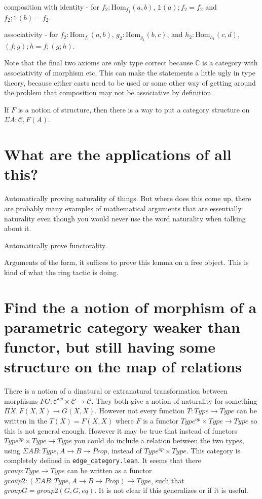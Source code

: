 \documentclass[12pt]{article} %
\theoremstyle{definition}
\theoremstyle{definition}
\theoremstyle{definition}
\theoremstyle{definition}
\begin{document}
composition with identity - for $f_2 : \text{Hom}_{f_1}(a,b)$, $\mathbb{1}(a) ; f_2 = f_2$ and $f_2 ; \mathbb{1}(b) = f_2$.

associativity - for $f_2 : \text{Hom}_{f_1}(a,b)$, $g_2 : \text{Hom}_{g_1}(b,c)$, and $h_2 : \text{Hom}_{h_1}(c, d)$,
  $(f ; g) ; h = f ; (g ; h)$.

Note that the final two axioms are only type correct because $\mathbb{C}$ is a category with associativity
of morphism etc. This can make the statements a little ugly in type theory, because either casts need to be used or
some other way of getting around the problem that composition may not be associative by definition.

If $F$ is a notion of structure, then there is a way to put a category structure on $\Sigma A : \mathcal{C}, F(A)$.


\section{What are the applications of all this?}

Automatically proving naturality of things. But where does this come up, there are probably many examples
of mathematical arguments that are essentially naturality even though you would never use the word naturality
when talking about it.

Automatically prove functorality.

Arguments of the form, it suffices to prove this lemma on a free object. 
This is kind of what the ring tactic is doing.

\section{Find the a notion of morphism of a parametric category weaker than functor, but
  still having some structure on the map of relations}

There is a notion of a dinatural or extranatural transformation between morphisms 
$F G : \mathcal{C}^{op} \times \mathcal{C} \rightarrow \mathcal{C}$. They both give 
a notion of naturality for something $\Pi X, F(X, X) \rightarrow G(X,X)$. However not
every function $T : Type \rightarrow Type$ can be written in the $T(X) = F(X, X)$ where 
$F$ is a functor $Type^{op} \times Type \rightarrow Type$ so this is not general enough. 
However it may be true that instead of functors $Type^{op} \times Type \rightarrow Type$
you could do include a relation between the two types, using $\Sigma A B : Type, A \rightarrow B \rightarrow Prop$,
instead of $Type^{op} \times Type$. This category is completely defined in \lstinline{edge_category.lean}.
It seems that there $group : Type \rightarrow Type$ can be written as a functor
$group2 : (\Sigma A B : Type, A \rightarrow B \rightarrow Prop) \rightarrow Type$, such that 
$group G = group2(G, G, eq)$. It is not clear if this generalizes or if it is useful.
\end{document}

